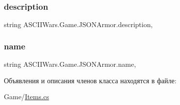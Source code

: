 \hypertarget{class_a_s_c_i_i_wars_1_1_game_1_1_j_s_o_n_armor_a078af0e88ca64ad7bad94897eb37ef0a}{}\label{class_a_s_c_i_i_wars_1_1_game_1_1_j_s_o_n_armor_a078af0e88ca64ad7bad94897eb37ef0a} 
\subsubsection{\texorpdfstring{description}{description}}
{\footnotesize\ttfamily string A\+S\+C\+I\+I\+Wars.\+Game.\+J\+S\+O\+N\+Armor.\+description\hspace{0.3cm}{\ttfamily [get]}, {\ttfamily [set]}}

\hypertarget{class_a_s_c_i_i_wars_1_1_game_1_1_j_s_o_n_armor_a5f29078c07ea3199d5e0e2aa48e5dd90}{}\label{class_a_s_c_i_i_wars_1_1_game_1_1_j_s_o_n_armor_a5f29078c07ea3199d5e0e2aa48e5dd90} 
\subsubsection{\texorpdfstring{name}{name}}
{\footnotesize\ttfamily string A\+S\+C\+I\+I\+Wars.\+Game.\+J\+S\+O\+N\+Armor.\+name\hspace{0.3cm}{\ttfamily [get]}, {\ttfamily [set]}}



Объявления и описания членов класса находятся в файле\+:\begin{DoxyCompactItemize}
\item 
Game/\hyperlink{_items_8cs}{Items.\+cs}\end{DoxyCompactItemize}
